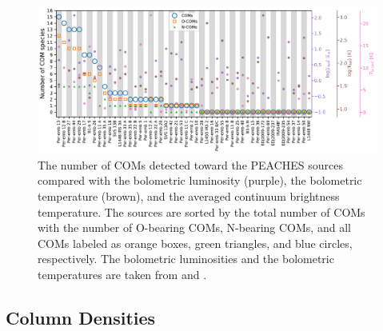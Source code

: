 \documentclass[twocolumn]{aastex62}
\begin{document}
\begin{figure}[htbp!]
  \centering
  \includegraphics[width=\textwidth]{detection_summary_all_bar.pdf}
  \caption{The number of COMs detected toward the PEACHES sources compared with the bolometric luminosity (purple), the bolometric temperature (brown), and the averaged continuum brightness temperature.  The sources are sorted by the total number of COMs with the number of O-bearing COMs, N-bearing COMs, and all COMs labeled as orange boxes, green triangles, and blue circles, respectively.  The bolometric luminosities and the bolometric temperatures are taken from \citet{2016ApJ...818...73T} and \citet{2016AA...592A..56M}.}
  \label{fig:detection_summary}
\end{figure}


\subsection{Column Densities}
\end{document}

